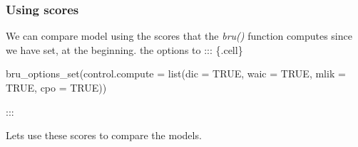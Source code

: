 \documentclass[
  letterpaper,
  DIV=11,
  numbers=noendperiod]{scrartcl}
\newenvironment{Shaded}{\begin{snugshade}}{\end{snugshade}}
\newcommand{\AttributeTok}[1]{\textcolor[rgb]{0.40,0.45,0.13}{#1}}
\newcommand{\ConstantTok}[1]{\textcolor[rgb]{0.56,0.35,0.01}{#1}}
\newcommand{\FunctionTok}[1]{\textcolor[rgb]{0.28,0.35,0.67}{#1}}
\newcommand{\NormalTok}[1]{\textcolor[rgb]{0.00,0.23,0.31}{#1}}
\begin{document}
\subsubsection{Using scores}\label{using-scores}

We can compare model using the scores that the \emph{bru()} function
computes since we have set, at the beginning. the options to :::
\{.cell\}

\begin{Shaded}
\begin{Highlighting}[]
\FunctionTok{bru\_options\_set}\NormalTok{(}\AttributeTok{control.compute =} \FunctionTok{list}\NormalTok{(}\AttributeTok{dic =} \ConstantTok{TRUE}\NormalTok{,}
                                       \AttributeTok{waic =} \ConstantTok{TRUE}\NormalTok{,}
                                       \AttributeTok{mlik =} \ConstantTok{TRUE}\NormalTok{,}
                                       \AttributeTok{cpo =} \ConstantTok{TRUE}\NormalTok{))}
\end{Highlighting}
\end{Shaded}

:::

Lets use these scores to compare the models.
\end{document}
